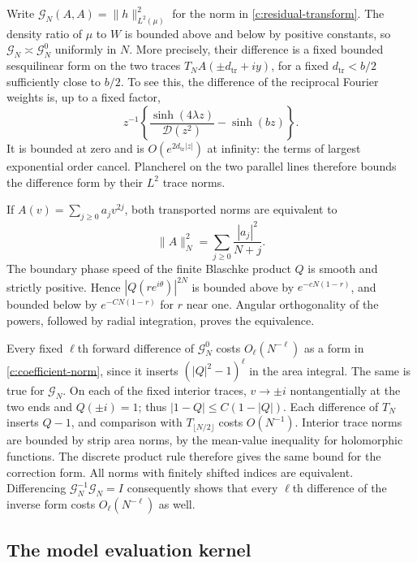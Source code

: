 \documentclass[11pt]{article}
\numberwithin{equation}{section}
\theoremstyle{definition}\newtheorem{definition}[theorem]{Definition}
\theoremstyle{remark}\newtheorem{remark}[theorem]{Remark}
\begin{document}
Write $\mathcal G_N(A,A)=\|h\|_{L^2(\mu)}^2$ for the norm in
\eqref{c:residual-transform}.  The density ratio of $\mu$ to $W$ is
bounded above and below by positive constants, so
$\mathcal G_N\asymp\mathcal G_N^0$ uniformly in $N$.
More precisely, their difference is a fixed bounded sesquilinear form
on the two traces $T_NA(\pm d_{\mathrm{tr}}+iy)$, for a fixed $d_{\mathrm{tr}}<b/2$ sufficiently
close to $b/2$.  To see this, the difference of the reciprocal Fourier
weights is, up to a fixed factor,
\[
 z^{-1}\left\{\frac{\sinh(4\lambda z)}{\mathcal D(z^2)}
                    -\sinh(bz)\right\}.
\]
It is bounded at zero and is $O(e^{2d_{\mathrm{tr}}|z|})$ at infinity: the terms of
largest exponential order cancel.  Plancherel on the two parallel
lines therefore bounds the difference form by their $L^2$ trace norms.

If $A(v)=\sum_{j\ge0}a_jv^{2j}$, both transported norms are equivalent
to
\begin{equation}\label{c:coefficient-norm}
 \|A\|_N^2=\sum_{j\ge0}\frac{|a_j|^2}{N+j}.
\end{equation}
The boundary phase speed of the finite Blaschke product $Q$ is smooth
and strictly positive.  Hence $|Q(re^{i\theta})|^{2N}$ is bounded
above by $e^{-cN(1-r)}$, and bounded below by
$e^{-CN(1-r)}$ for $r$ near one.  Angular orthogonality of the powers,
followed by radial integration, proves the equivalence.

Every fixed $\ell$th forward difference of $\mathcal G_N^0$ costs
$O_\ell(N^{-\ell})$ as a form in \eqref{c:coefficient-norm}, since
it inserts $(|Q|^2-1)^\ell$ in the area integral.  The same is true
for $\mathcal G_N$.  On each of the fixed interior traces,
$v\to\pm i$ nontangentially at the two ends and $Q(\pm i)=1$; thus
$|1-Q|\le C(1-|Q|)$.  Each difference of $T_N$ inserts $Q-1$,
and comparison with $T_{\lfloor N/2\rfloor}$ costs $O(N^{-1})$.
Interior trace norms are bounded by strip area norms, by the mean-value
inequality for holomorphic functions.  The discrete product rule
therefore gives the same bound for the correction form.  All norms
with finitely shifted indices are equivalent.  Differencing
$\mathcal G_N^{-1}\mathcal G_N=I$ consequently shows that every
$\ell$th difference of the inverse form costs $O_\ell(N^{-\ell})$
as well.

\subsection{The model evaluation kernel}
\end{document}

